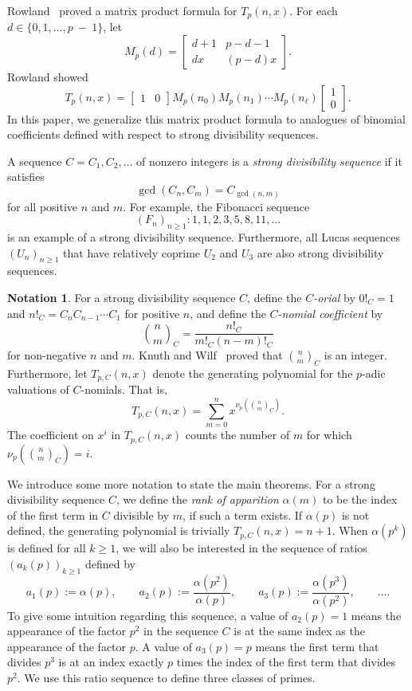\documentclass{amsart}
\theoremstyle{definition}
\newtheorem*{notation*}{Notation}
\begin{document}
Rowland~\cite{Rowland2018} proved a matrix product formula for $T_p(n,x)$. For each $d \in \{0, 1, \dots, p~-~1\}$, let 
\[
M_p(d) = \begin{bmatrix}
d + 1 & p - d - 1 \\
dx & (p - d)x
\end{bmatrix}.
\]
Rowland showed 
\[
T_p(n, x) = \begin{bmatrix} 1 & 0 \end{bmatrix} M_p(n_0) M_p(n_1) \cdots M_p(n_\ell) \begin{bmatrix} 1 \\ 0 \end{bmatrix}.
\]
In this paper, we generalize this matrix product formula to analogues of binomial coefficients defined with respect to strong divisibility sequences. 

A sequence $C = C_1, C_2, \dots$ of nonzero integers is a \emph{strong divisibility sequence} if it satisfies \[
\gcd(C_n, C_m) = C_{\gcd(n, m)}
\] for all positive $n$ and $m$.
For example, the Fibonacci sequence $$(F_n)_{n\geq1}\colon 1, 1, 2, 3, 5, 8, 11, \dots$$ is an example of a strong divisibility sequence. Furthermore, all Lucas sequences $(U_n)_{n\geq1}$ that have relatively coprime $U_2$ and $U_3$ are also strong divisibility sequences. 

\begin{notation*}
For a strong divisibility sequence $C$, define the \emph{$ C $-orial} by $0!_C=1$ and $n!_C = C_n C_{n-1} \cdots C_1$ for positive $n$, and define the \emph{$ C $-nomial coefficient} by
\[
\binom{n}{m}_C = \frac{n!_C}{m!_C (n - m)!_C}
\] for non-negative $n$ and $m$. Knuth and Wilf~\cite{KnuthWilf1989} proved that $\binom{n}{m}_C$ is an integer.
Furthermore, let $ T_{p,C}(n,x) $ denote the generating polynomial for the $ p $-adic valuations of $ C $-nomials. 
That is, 
\[
T_{p,C}(n,x) = \sum_{m=0}^n x^{\nu_p\!\left( \binom{n}{m}_C \right)}.
\]
The coefficient on $x^i$ in $T_{p,C}(n,x)$ counts the number of $m$ for which $\nu_p\!\left(\binom{n}{m}_C\right)=i$.
\end{notation*}
We introduce some more notation to state the main theorems. For a strong divisibility sequence $C$, we define the \emph{rank of apparition} $ \alpha(m) $ to be the index of the first term in $ C $ divisible by $ m $, if such a term exists. 
If $\alpha(p)$ is not defined, the generating polynomial is trivially $T_{p,C}(n,x)=n+1$.
When $\alpha(p^k)$ is defined for all $k \geq 1$, we will also be interested in the sequence of ratios $(a_k(p))_{k\geq1}$ defined by
\[
a_1(p) := \alpha(p), \qquad a_2(p) := \frac{\alpha(p^2)}{\alpha(p)}, \qquad a_3(p) := \frac{\alpha(p^3)}{\alpha(p^2)}, \qquad \dots.
\] 
To give some intuition regarding this sequence, a value of $a_2(p)=1$ means the appearance of the factor $p^2$ in the sequence $C$ is at the same index as the appearance of the factor $p$. A value of $a_3(p)=p$ means the first term that divides $p^3$ is at an index exactly $p$ times the index of the first term that divides $p^2$. We use this ratio sequence to define three classes of primes.
\end{document}
